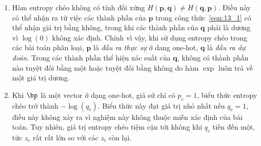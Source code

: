 \begin{mydeff}
\begin{enumerate}
    \item Hàm entropy chéo không có tính đối xứng $H(\mathbf{p},
    \mathbf{q}) \neq H(\mathbf{q}, \mathbf{p})$. Điều này có thể nhận ra 
    từ việc các thành phần của $\mathbf{p}$ trong công thức~\eqref{eqn:13_1} có
    thể nhận giá trị bằng không, trong khi các thành phần của $\mathbf{q}$ phải
    là dương vì $\log(0)$ không xác định. Chính vì vậy, khi sử dụng entropy chéo
    trong các bài toán phân loại, $\mathbf{p}$ là \textit{đầu ra thực sự} ở dang
    one-hot, $\mathbf{q}$ là \textit{đầu ra dự đoán}. Trong các thành phần thể
    hiện xác suất của $\mathbf{q}$, không có thành phần nào tuyệt đối bằng một
    hoặc tuyệt đối bằng không do hàm $\exp$ luôn trả về một giá trị dương.

    \item Khi $\bp$ là một vector ở dạng one-hot, giả sử chỉ có $p_c = 1$, biểu thức entropy chéo trở thành $-\log(q_c)$. Biểu thức này đạt giá trị
    nhỏ nhất nếu $q_c = 1$, điều này không xảy ra vì nghiệm này không thuộc miền
    xác định của bài toán. Tuy nhiên, giá trị entropy chéo tiệm cận tới không
    khi $q_c$ tiến đến một, tức $z_c$ rất rất lớn so với các $z_i$ còn lại.
\end{enumerate}
\end{mydeff}
 
